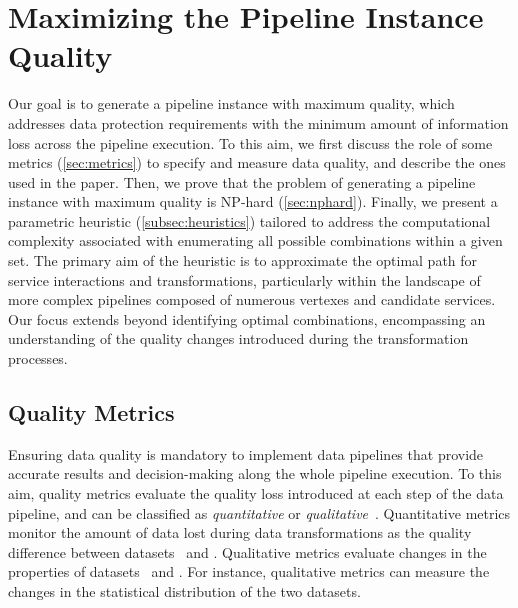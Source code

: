 \section{Maximizing the Pipeline Instance Quality}\label{sec:heuristics}
%
Our goal is to generate a pipeline instance with maximum quality, which addresses data protection requirements with the minimum amount of information loss across the pipeline execution. To this aim, we first discuss the role of some metrics (\cref{sec:metrics}) to specify and measure data quality, and describe the ones used in the paper.
Then, we prove that the problem of generating a pipeline instance with maximum quality is NP-hard (\cref{sec:nphard}). Finally, we present a parametric heuristic (\cref{subsec:heuristics}) tailored to address the computational complexity associated with enumerating all possible combinations within a given set. The primary aim of the heuristic is to approximate the optimal path for service interactions and transformations, particularly within the landscape of more complex pipelines composed of numerous vertexes and candidate services. Our focus extends beyond identifying optimal combinations, encompassing an understanding of the quality changes introduced during the transformation processes.


\subsection{Quality Metrics}\label{subsec:metrics}
Ensuring data quality is mandatory to implement data pipelines that provide accurate results and decision-making along the whole pipeline execution. To this aim, quality metrics evaluate the quality loss introduced at each step of the data pipeline, and can be classified as \emph{quantitative} or \emph{qualitative}~\cite{ADD}.
Quantitative metrics monitor the amount of data lost during data transformations as the quality difference between datasets \origdataset\ and \transdataset.
Qualitative metrics evaluate changes in the properties of datasets \origdataset\ and \transdataset. For instance, qualitative metrics can measure the changes in the statistical distribution of the two datasets.

